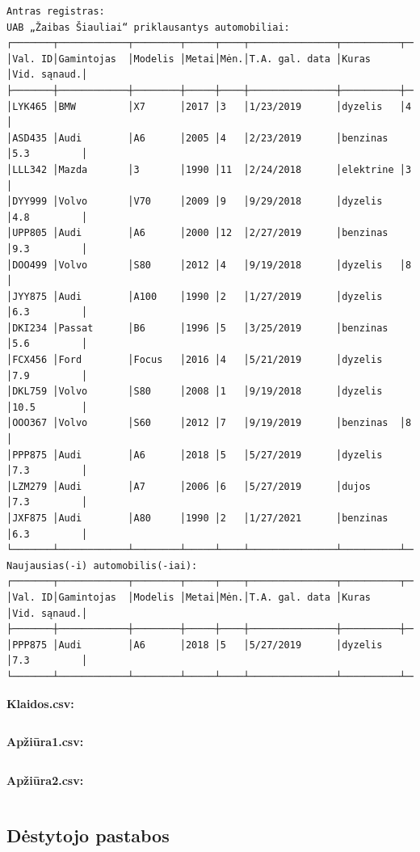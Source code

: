 \documentclass{article}
\begin{document}
\begin{verbatim}
Antras registras:
UAB „Žaibas Šiauliai“ priklausantys automobiliai:
┌───────┬────────────┬────────┬─────┬────┬───────────────┬──────────┬────────────┐
│Val. ID│Gamintojas  │Modelis │Metai│Mėn.│T.A. gal. data │Kuras     │Vid. sąnaud.│
├───────┼────────────┼────────┼─────┼────┼───────────────┼──────────┼────────────┤
│LYK465 │BMW         │X7      │2017 │3   │1/23/2019      │dyzelis   │4           │
│ASD435 │Audi        │A6      │2005 │4   │2/23/2019      │benzinas  │5.3         │
│LLL342 │Mazda       │3       │1990 │11  │2/24/2018      │elektrine │3           │
│DYY999 │Volvo       │V70     │2009 │9   │9/29/2018      │dyzelis   │4.8         │
│UPP805 │Audi        │A6      │2000 │12  │2/27/2019      │benzinas  │9.3         │
│DOO499 │Volvo       │S80     │2012 │4   │9/19/2018      │dyzelis   │8           │
│JYY875 │Audi        │A100    │1990 │2   │1/27/2019      │dyzelis   │6.3         │
│DKI234 │Passat      │B6      │1996 │5   │3/25/2019      │benzinas  │5.6         │
│FCX456 │Ford        │Focus   │2016 │4   │5/21/2019      │dyzelis   │7.9         │
│DKL759 │Volvo       │S80     │2008 │1   │9/19/2018      │dyzelis   │10.5        │
│OOO367 │Volvo       │S60     │2012 │7   │9/19/2019      │benzinas  │8           │
│PPP875 │Audi        │A6      │2018 │5   │5/27/2019      │dyzelis   │7.3         │
│LZM279 │Audi        │A7      │2006 │6   │5/27/2019      │dujos     │7.3         │
│JXF875 │Audi        │A80     │1990 │2   │1/27/2021      │benzinas  │6.3         │
└───────┴────────────┴────────┴─────┴────┴───────────────┴──────────┴────────────┘
Naujausias(-i) automobilis(-iai):
┌───────┬────────────┬────────┬─────┬────┬───────────────┬──────────┬────────────┐
│Val. ID│Gamintojas  │Modelis │Metai│Mėn.│T.A. gal. data │Kuras     │Vid. sąnaud.│
├───────┼────────────┼────────┼─────┼────┼───────────────┼──────────┼────────────┤
│PPP875 │Audi        │A6      │2018 │5   │5/27/2019      │dyzelis   │7.3         │
└───────┴────────────┴────────┴─────┴────┴───────────────┴──────────┴────────────┘
\end{verbatim}
\normalsize

\textbf{Klaidos.csv:}
\inputminted{csharp}{Assets/L3/klaidos1.csv}

\textbf{Apžiūra1.csv:}
\inputminted{csharp}{Assets/L3/apziura1-1.csv}

\textbf{Apžiūra2.csv:}
\inputminted{csharp}{Assets/L3/apziura1-2.csv}


\subsection{Dėstytojo pastabos}
\newpage
\end{document}
